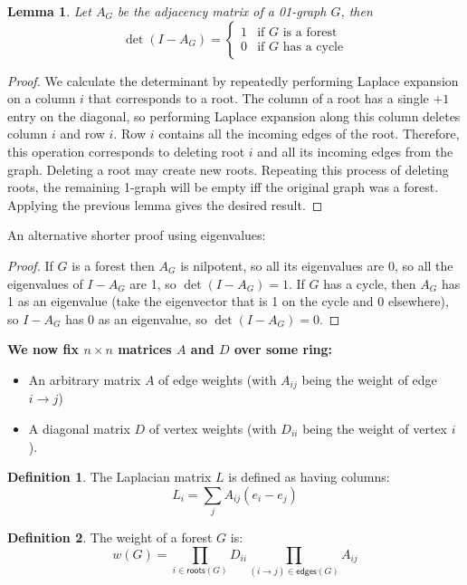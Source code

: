 \documentclass[a4paper, 11pt]{article}
\newtheorem{lemma}[theorem]{Lemma}
\theoremstyle{definition}
\newtheorem{definition}{Definition}[section]
\begin{document}
\begin{lemma}
  Let $A_G$ be the adjacency matrix of a 01-graph $G$, then
  \[
    \det(I-A_G) = \begin{cases}
      1 & \text{if $G$ is a forest}\\
      0 & \text{if $G$ has a cycle}
    \end{cases}
  \]
\end{lemma}
\begin{proof}
We calculate the determinant by repeatedly performing Laplace expansion on a column $i$ that corresponds to a root. The column of a root has a single $+1$ entry on the diagonal, so performing Laplace expansion along this column deletes column $i$ and row $i$. Row $i$ contains all the incoming edges of the root. Therefore, this operation corresponds to deleting root $i$ and all its incoming edges from the graph. Deleting a root may create new roots. Repeating this process of deleting roots, the remaining 1-graph will be empty iff the original graph was a forest. Applying the previous lemma gives the desired result.
\end{proof}

An alternative shorter proof using eigenvalues:

\begin{proof}
  If $G$ is a forest then $A_G$ is nilpotent, so all its eigenvalues are $0$, so all the eigenvalues of $I - A_G$ are 1, so $\det(I - A_G) = 1$.
  If $G$ has a cycle, then $A_G$ has 1 as an eigenvalue (take the eigenvector that is 1 on the cycle and 0 elsewhere), so $I - A_G$ has 0 as an eigenvalue, so $\det(I - A_G) = 0$.
\end{proof}

\textbf{We now fix $n\times n$ matrices $A$ and $D$ over some ring:}

\begin{itemize}
  \item An arbitrary matrix $A$ of edge weights (with $A_{ij}$ being the weight of edge $i \to j$)
  \item A diagonal matrix $D$ of vertex weights (with $D_{ii}$ being the weight of vertex $i$).
\end{itemize}

\begin{definition}
  The Laplacian matrix $L$ is defined as having columns:
  \[ L_i = \sum_j A_{ij}(e_i - e_j) \]
\end{definition}

\begin{definition}
  The weight of a forest $G$ is:
  \[w(G) = \prod_{i \in \mathsf{roots}(G)} D_{ii} \prod_{(i \to j) \in \mathsf{edges}(G)} A_{ij} \]
\end{definition}
\end{document}
